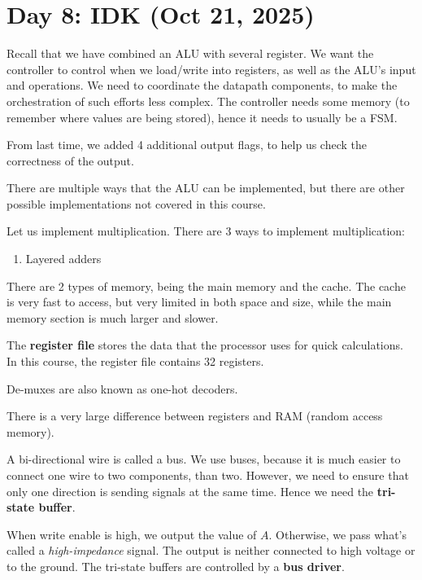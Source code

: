 \section{Day 8: IDK (Oct 21, 2025)}

Recall that we have combined an ALU with several register. We want the controller to control when we load/write into registers, as well as the ALU's input and operations. We need to coordinate the datapath components, to make the orchestration of such efforts less complex. The controller needs some memory (to remember where values are being stored), hence it needs to usually be a FSM.

From last time, we added 4 additional output flags, to help us check the correctness of the output.

\begin{remark}
There are multiple ways that the ALU can be implemented, but there are other possible implementations not covered in this course.
\end{remark}

Let us implement multiplication. There are 3 ways to implement multiplication:
\begin{enumerate}
\item Layered adders
\end{enumerate}

There are 2 types of memory, being the main memory and the cache. The cache is very fast to access, but very limited in both space and size, while the main memory section is much larger and slower.

The \textbf{register file} stores the data that the processor uses for quick calculations. In this course, the register file contains 32 registers.

De-muxes are also known as one-hot decoders.

There is a very large difference between registers and RAM (random access memory). 

A bi-directional wire is called a bus. We use buses, because it is much easier to connect one wire to two components, than two. However, we need to ensure that only one direction is sending signals at the same time. Hence we need the \textbf{tri-state buffer}.

When write enable is high, we output the value of $A$. Otherwise, we pass what's called a \textit{high-impedance} signal. The output is neither connected to high voltage or to the ground. The tri-state buffers are controlled by a \textbf{bus driver}.
